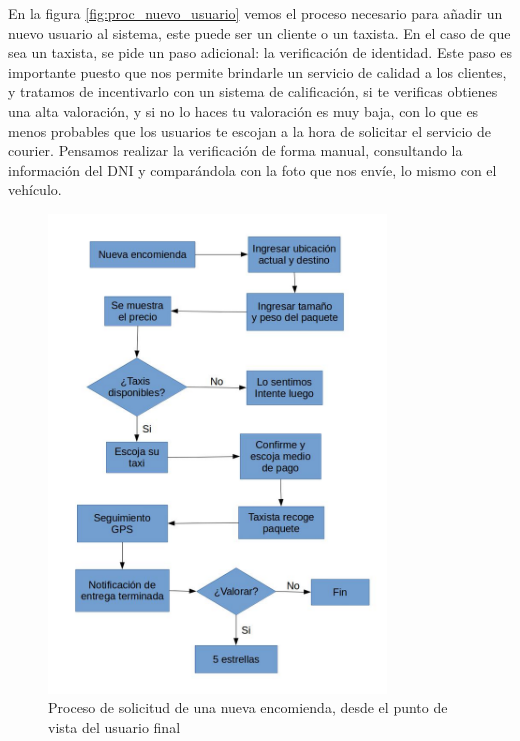 En la figura \ref{fig:proc_nuevo_usuario} vemos el proceso necesario para añadir un nuevo usuario al sistema, este puede ser un cliente o un taxista. En el caso de que sea un taxista, se pide un paso adicional: la verificación de identidad. Este paso es importante puesto que nos permite brindarle un servicio de calidad a los clientes, y tratamos de incentivarlo con un sistema de calificación, si te verificas obtienes una alta valoración, y si no lo haces tu valoración es muy baja, con lo que es menos probables que los usuarios te escojan a la hora de solicitar el servicio de courier. Pensamos realizar la verificación de forma manual, consultando la información del DNI y comparándola con la foto que nos envíe, lo mismo con el vehículo.


\begin{figure}[htb]
\centering
\includegraphics[width=0.8\textwidth]{./img/nueva_encomienda.jpg}
\caption{Proceso de solicitud de una nueva encomienda, desde el punto de vista del usuario final} \label{fig:proc_nueva_encomienda}
\end{figure}



